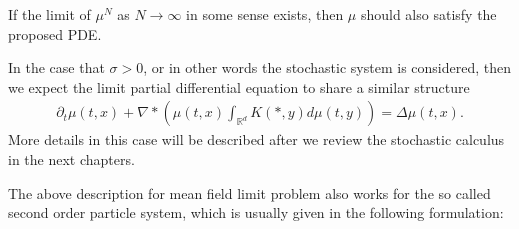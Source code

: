 \begin{note}
	If the limit of $\mu^N$ as $N\to \infty$ in some sense exists, then $\mu $ should also satisfy the proposed PDE.

  In the case that $\sigma  > 0$, or in other words the stochastic system is considered, then we expect the limit partial differential equation to share a similar structure
  \begin{align*}
    \partial_t \mu(t,x) + \nabla * \left( \mu(t,x) \int_{\mathbb{R}^{d} } K(*,y) d\mu(t,y) \right)  = \Delta \mu(t,x)
  .\end{align*}
  More details  in this case will be described after we review the stochastic calculus in the next chapters.
\end{note}

\vskip5mm

The above description for mean field limit problem also works for the so called second order particle system, which is usually given in the following formulation:

